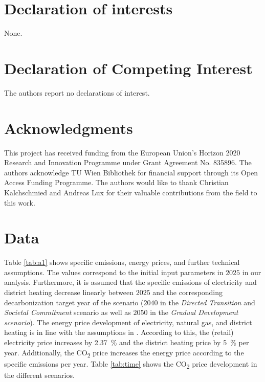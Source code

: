 \documentclass[review]{elsarticle}
\begin{document}






\section*{Declaration of interests}
None.
\section*{Declaration of Competing Interest}
The authors report no declarations of interest.
\section*{Acknowledgments}
This project has received funding from the European Union's Horizon 2020 Research and Innovation Programme under Grant Agreement No. 835896. The authors acknowledge TU Wien Bibliothek for financial support through its Open Access Funding Programme. The authors would like to thank Christian Kalchschmied and Andreas Lux for their valuable contributions from the field to this work.


\appendix
\setcounter{table}{0}
\setcounter{figure}{0}
\newpage
\section{Data}\label{app:data}
Table \ref{tab:a1} shows specific emissions, energy prices, and further technical assumptions. The values correspond to the initial input parameters in $2025$ in our analysis. Furthermore, it is assumed that the specific emissions of electricity and district heating decrease linearly between $2025$ and the corresponding decarbonization target year of the scenario ($2040$ in the \textit{Directed Transition} and \textit{Societal Commitment} scenario as well as $2050$ in the \textit{Gradual Development scenario}). The energy price development of electricity, natural gas, and district heating is in line with the assumptions in \cite{fina2019profitability}.  According to this, the (retail) electricity price increases by \SI{2.37}{\%} and the district heating price by \SI{5}{\%} per year. Additionally, the CO\textsubscript{2} price increases the energy price according to the specific emissions per year. Table \ref{tab:time} shows the CO\textsubscript{2} price development in the different scenarios.
\end{document}
